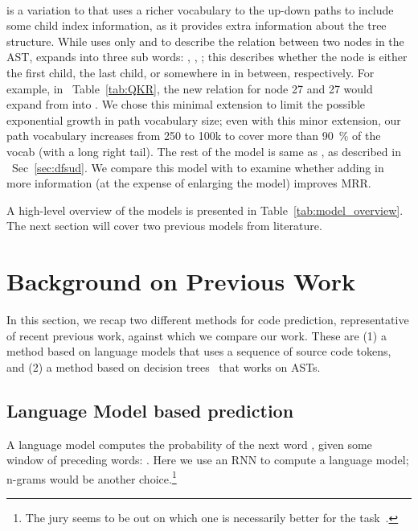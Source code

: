\documentclass[nonacm, sigconf]{acmart}
\newcommand{\secref}[1]{Sec~\ref{#1}}
\newcommand{\tabref}[1]{Table~\ref{#1}}
\begin{document}
\paragraph{\textbf{\TreeReli}}
\TreeReli is a variation to \TreeRel that uses a richer vocabulary to the up-down paths to include some child index information, as it provides extra information about the tree structure. While \TreeRel uses only  and  to describe the relation between two nodes in the AST, \TreeReli expands  into three sub words: , , ; this describes whether the node is either the first child, the last child, or somewhere in in between, respectively. For example, in ~\tabref{tab:QKR}, the new relation for node 27 and 27 would expand from  into . We chose this minimal extension to limit the possible exponential growth in path vocabulary size; even with this minor extension, our path vocabulary increases from 250 to 100k to cover more than 90~\% of the vocab (with a long right tail). The rest of the model is same as \TreeRel, as described in ~\secref{sec:dfsud}. We compare this model with \TreeRel to examine whether adding in more information (at the expense of enlarging the model) improves MRR.  

A high-level overview of the models is presented in \tabref{tab:model_overview}. The next section will cover two previous models from literature.
 
\section{Background on Previous Work}
\label{sec:previouswork}

In this section, we recap two different methods for code prediction, representative of recent previous work, against which we compare
our work.  These are (1) a method based on language models that uses a sequence of source code tokens, and (2) a  method based on decision trees~\cite{raychev2016probabilistic-deep3-eth-dt} that works on ASTs.

\subsection{Language Model based prediction}

A language model computes the probability of the next word , given some window of preceding words:
.  Here we use an RNN to compute a language model; n-grams would be another choice.\footnote{The jury seems to be out on which one is necessarily better for the task~\cite{hellendoorn2017are-deep-best, karampatsis2020big-bpe}.}
\end{document}
